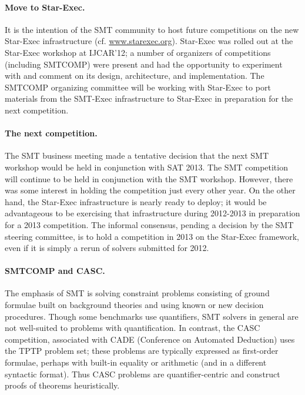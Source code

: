 \documentclass[twosize,11pt]{article}
\begin{document}
\paragraph{Move to Star-Exec.} It is the intention of the SMT community to host future competitions on the new Star-Exec infrastructure (cf. \url{www.starexec.org}). Star-Exec was rolled out at the Star-Exec workshop at IJCAR'12; a number of organizers of competitions (including SMTCOMP) were present and had the opportunity to experiment with and comment on its 
design, architecture, and implementation. The SMTCOMP organizing committee will be working with Star-Exec to port materials from the SMT-Exec infrastructure to Star-Exec in preparation for the next competition.


\paragraph{The next competition.} The SMT business meeting made a tentative decision that the next SMT workshop would be held in conjunction with SAT 2013. The SMT competition will continue to be held in conjunction with the SMT workshop. However, there was some interest in holding the competition just every other year. On the other hand, the Star-Exec infrastructure is nearly ready to deploy; it would be advantageous to be exercising that infrastructure during 2012-2013 in preparation for a 2013 competition. The informal consensus, pending a decision by the SMT steering committee, is to hold a competition in 2013 on the Star-Exec framework, even if it is simply a rerun of solvers submitted for 2012.

\paragraph{SMTCOMP and CASC.}

The emphasis of SMT is solving constraint problems consisting of ground formulae built on background theories and using known or new decision procedures. Though some benchmarks use quantifiers, SMT solvers in general are not well-suited to problems with quantification. In contrast, the CASC competition, associated with CADE (Conference on Automated Deduction) uses the TPTP problem set; these problems are typically expressed as first-order formulae, perhaps with built-in equality or arithmetic (and in a different syntactic format). Thus CASC problems are quantifier-centric and construct proofs of theorems heuristically.
\end{document}
